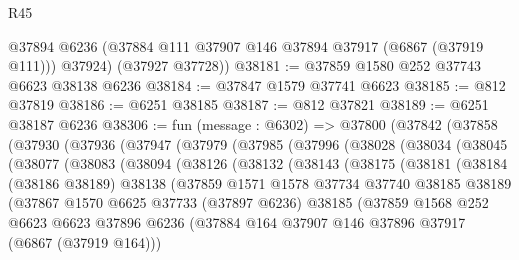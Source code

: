 \begin{lexlean}{R45}
\begin{coremodule}
{        @37894
        @6236
        (@37884 @111 @37907 @146 @37894 @37917 (@6867 (@37919 @111)))
        @37924)
      (@37927 @37728))
@38181 := @37859 @1580 @252 @37743 @6623 @38138 @6236
@38184 := @37847 @1579 @37741 @6623
@38185 := @812 @37819
@38186 := @6251 @38185
@38187 := @812 @37821
@38189 := @6251 @38187 @6236
@38306 := fun (message : @6302) =>
  @37800
    (@37842
      (@37858
        (@37930
          (@37936
            (@37947
              (@37979
                (@37985
                  (@37996
                    (@38028
                      (@38034
                        (@38045
                          (@38077
                            (@38083
                              (@38094
                                (@38126
                                  (@38132
                                    (@38143
                                      (@38175
                                        (@38181
                                          (@38184
                                            (@38186 @38189)
                                            @38138
                                            (@37859
                                              @1571
                                              @1578
                                              @37734
                                              @37740
                                              @38185
                                              @38189
                                              (@37867
                                                @1570
                                                @6625
                                                @37733
                                                (@37897 @6236)
                                                @38185
                                                (@37859
                                                  @1568
                                                  @252
                                                  @6623
                                                  @6623
                                                  @37896
                                                  @6236
                                                  (@37884
                                                    @164
                                                    @37907
                                                    @146
                                                    @37896
                                                    @37917
                                                    (@6867 (@37919 @164)))
}
\end{coremodule}
\end{lexlean}
